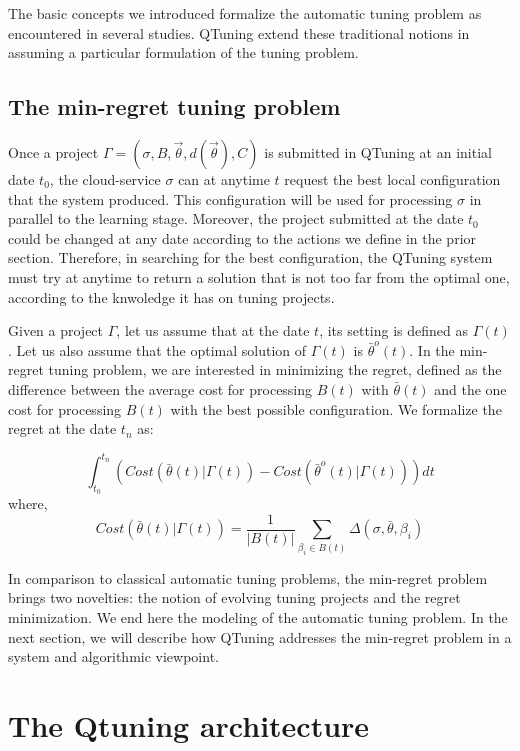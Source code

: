 \documentclass[10pt, conference, compsocconf]{IEEEtran}
\begin{document}
The basic concepts we introduced formalize the automatic tuning problem as encountered in several studies. 
QTuning extend these traditional notions in assuming a particular formulation of the tuning problem. 

\subsection{The min-regret tuning problem}

Once a project $ \Gamma = (\sigma, B, \vec{\theta}, d(\vec{\theta}), C)$ is submitted in QTuning at an initial 
date $t_0$, the cloud-service $\sigma$ can at anytime $t$ request the best local configuration that the 
system produced. This configuration will be used for processing $\sigma$ in parallel to the  learning stage. 
Moreover, the project submitted at the date $t_0$ could be changed at any date according to the actions we define 
in the prior section. Therefore, in searching for the best configuration, the QTuning system must try at anytime 
to return a solution that is not too far from the optimal one, according to the knwoledge it has on tuning projects. 

Given a project $\Gamma$, let us assume that at the date $t$, its setting is defined as $\Gamma(t)$. 
Let us also assume that the optimal solution of $\Gamma(t)$ is $\bar{\theta}^o(t)$. 
In the min-regret tuning problem, we are interested in minimizing the regret, defined as the 
difference between the average cost for processing $B(t)$ with $\bar{\theta}(t)$ and the one cost for 
processing $B(t)$ with the best possible configuration. We formalize the regret at the date $t_n$ as: 

\[
\int_{t_0}^{t_n} \left( Cost(\bar{\theta}(t)| \Gamma(t)) - Cost(\bar{\theta}^o(t) | \Gamma(t)) \right) dt
\]
where, 
\[
Cost(\bar{\theta}(t) | \Gamma(t)) = \frac{1}{|B(t)|}\sum_{\beta_i \in B(t)} \Delta(\sigma, \bar{\theta}, \beta_i) 
\]


In comparison to classical automatic tuning problems, the min-regret problem brings two novelties: 
the notion of evolving tuning projects and the regret minimization. 
We end here the modeling of the automatic tuning problem. In the next section, we will describe how 
QTuning addresses the min-regret problem in a system and algorithmic viewpoint.

\section{The Qtuning architecture} \label{Architecture}
\end{document}
